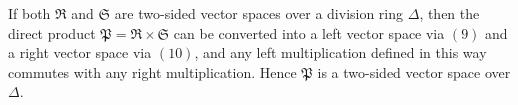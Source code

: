 If both $\mathfrak{R}$ and $\mathfrak{S}$ are two-sided vector spaces over a division ring $\Delta$, then the direct product $\mathfrak{P} = \mathfrak{R} \times \mathfrak{S}$ can be converted into a left vector space via $(9)$ and a right vector space via $(10)$, and any left multiplication defined in this way commutes with any right multiplication. Hence $\mathfrak{P}$ is a two-sided vector space over $\Delta$.
